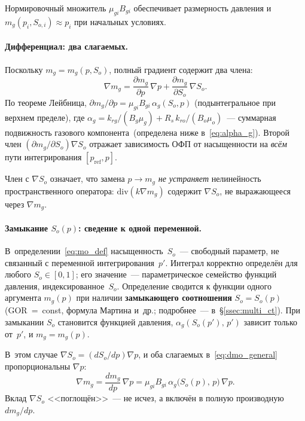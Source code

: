 ﻿\documentclass[12pt,a4paper]{article}
\begin{document}
Нормировочный множитель $\mu_{gi}B_{gi}$ обеспечивает размерность
давления и $m_g(p_i, S_{o,i}) \approx p_i$ при начальных условиях.

\paragraph{Дифференциал: два слагаемых.}
Поскольку $m_g = m_g(p, S_o)$, полный градиент содержит
два члена:
\begin{equation}\label{eq:dmo_general}
  \nabla m_g = \frac{\partial m_g}{\partial p}\,\nabla p
  + \frac{\partial m_g}{\partial S_o}\,\nabla S_o.
\end{equation}
По теореме Лейбница, $\partial m_g/\partial p
= \mu_{gi}B_{gi}\,\alpha_g(S_o, p)$
(подынтегральное при верхнем пределе), где
$\alpha_g = k_{rg}/(B_g\mu_g) + R_s\,k_{ro}/(B_o\mu_o)$~---
суммарная подвижность газового компонента~(определена
ниже в~\eqref{eq:alpha_g}).
Второй член $(\partial m_g/\partial S_o)\nabla S_o$
отражает зависимость ОФП от насыщенности на \emph{всём}
пути интегрирования $[p_{\mathrm{ref}}, p]$.

Член с $\nabla S_o$ означает, что замена $p \to m_g$
\emph{не устраняет} нелинейность пространственного оператора:
$\mathrm{div}(k\nabla m_g)$ содержит $\nabla S_o$,
не выражающееся через $\nabla m_g$.

\paragraph{Замыкание $S_o(p)$: сведение к одной переменной.}
В~определении~\eqref{eq:mo_def} насыщенность~$S_o$~---
свободный параметр, не связанный с переменной интегрирования~$p'$.
Интеграл корректно определён для любого
$S_o \in [0,1]$; его значение~--- параметрическое семейство
функций давления, индексированное~$S_o$.
Определение сводится к функции одного аргумента $m_g(p)$
при наличии \textbf{замыкающего соотношения} $S_o = S_o(p)$
(GOR~=~const, формула Мартина и~др.;
подробнее~--- в~\S\ref{ssec:multi_ct}).
При замыкании $S_o$ становится функцией давления,
$\alpha_g(S_o(p'),\,p')$ зависит только от~$p'$,
и $m_g = m_g(p)$.

В~этом случае $\nabla S_o = (dS_o/dp)\nabla p$,
и оба слагаемых в~\eqref{eq:dmo_general}
пропорциональны $\nabla p$:
\begin{equation}\label{eq:dmo}
  \nabla m_g = \frac{dm_g}{dp}\,\nabla p
  = \mu_{gi}B_{gi}\,\alpha_g\bigl(S_o(p),\,p\bigr)\,\nabla p.
\end{equation}
Вклад $\nabla S_o$ <<поглощён>>~--- не исчез, а включён
в полную производную $dm_g/dp$.
\end{document}
